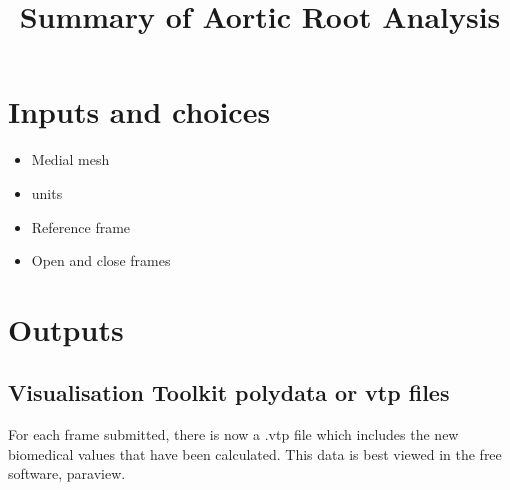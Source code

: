 \documentclass{article}
\title{Summary of Aortic Root Analysis}
\begin{document}
\maketitle

\section{Inputs and choices}
\begin{itemize}
    \item Medial mesh
    \item units
    \item Reference frame
    \item Open and close frames
\end{itemize}
\section{Outputs}
\subsection{Visualisation Toolkit polydata or vtp files}
For each frame submitted, there is now a .vtp file which includes the new biomedical values that have been calculated. This data is best viewed in the free software, paraview. 
\end{document}
